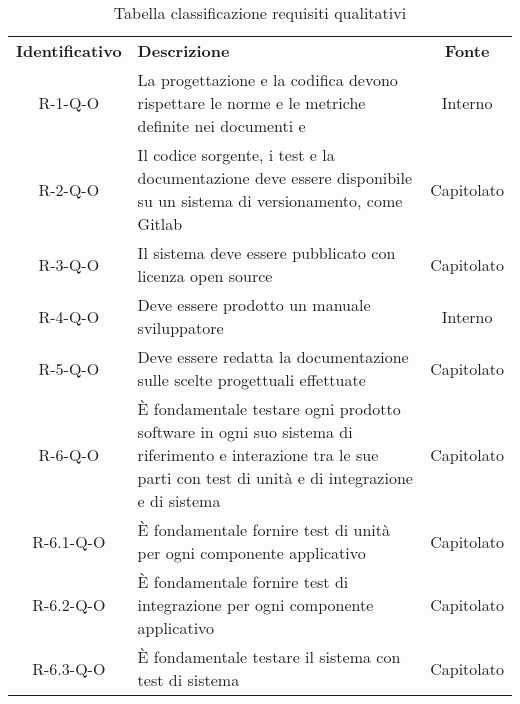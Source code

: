 \renewcommand{\arraystretch}{1.5}
\begin{longtable}{ c C{9cm} c }
    \caption{Tabella classificazione requisiti qualitativi}\\
    \rowcolor{\primaryColor}
    \textcolor{\secondaryColor}{
    \textbf{Identificativo}} & \textcolor{\secondaryColor}{\textbf{Descrizione}}                                                            & \textcolor{\secondaryColor}
    {\textbf{Fonte}}                                                                                                                                                      \\


    R-1-Q-O     & La progettazione e la codifica devono rispettare le norme e le metriche definite nei documenti \NdPv{} e \PdQv{} & Interno\\
    R-2-Q-O     & Il codice sorgente, i test e la documentazione deve essere disponibile su un sistema di versionamento, come Gitlab & Capitolato\\
    R-3-Q-O     & Il sistema deve essere pubblicato con licenza open source & Capitolato\\
    R-4-Q-O     & Deve essere prodotto un manuale sviluppatore & Interno \\
    R-5-Q-O     & Deve essere redatta la documentazione sulle scelte progettuali effettuate & Capitolato \\
    R-6-Q-O     & \`{E} fondamentale testare ogni prodotto software in ogni suo sistema di riferimento e interazione tra le sue parti con test di unità e di integrazione e di sistema & Capitolato\\
    R-6.1-Q-O   & \`{E} fondamentale fornire test di unità per ogni componente applicativo & Capitolato \\
    R-6.2-Q-O   & \`{E} fondamentale fornire test di integrazione per ogni componente applicativo & Capitolato \\
    R-6.3-Q-O   & \`{E} fondamentale testare il sistema con test di sistema & Capitolato \\




\end{longtable}